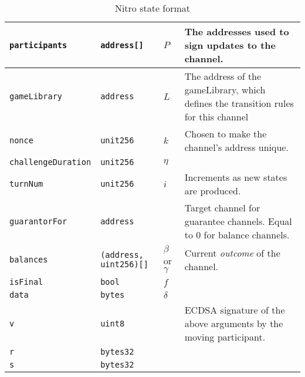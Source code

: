 \begin{table}[h]\centering
  \begin{tabular}{|l|l|l|p{5cm}|}
    \hline
    \texttt{participants} & \texttt{address[]} & $P$ & The addresses used to sign updates to the channel. \\ \hline
    \texttt{gameLibrary} & \texttt{address} & $L$ & The address of the gameLibrary, which defines the transition rules for this channel \\ \hline
    \texttt{nonce} & \texttt{unit256} & $k$ & Chosen to make the channel's address unique. \\ \hline
    \texttt{challengeDuration} & \texttt{unit256} & $\eta$ & \\ \hline
    \texttt{turnNum} & \texttt{unit256} & $i$ & Increments as new states are produced. \\ \hline
    \texttt{guarantorFor} & \texttt{address} &  & Target channel for guarantee channels. Equal to 0 for balance channels. \\ \hline
    \texttt{balances} & \texttt{(address, uint256)[]} & $\beta$ or $\gamma$ & Current \textit{outcome} of the channel. \\ \hline
    \texttt{isFinal} & \texttt{bool} & $f$ & \\ \hline
    \texttt{data} & \texttt{bytes} & $\delta$ & \\ \hline
    \texttt{v} & \texttt{uint8} & &  ECDSA signature of the above arguments by the moving participant. \\ \cline{1-2}
    \texttt{r} & \texttt{bytes32} & & \\ \cline{1-2}
    \texttt{s} & \texttt{bytes32} & & \\ \hline
  \end{tabular}
  \caption{Nitro state format}
  \label{table:force-move-state}
\end{table}
